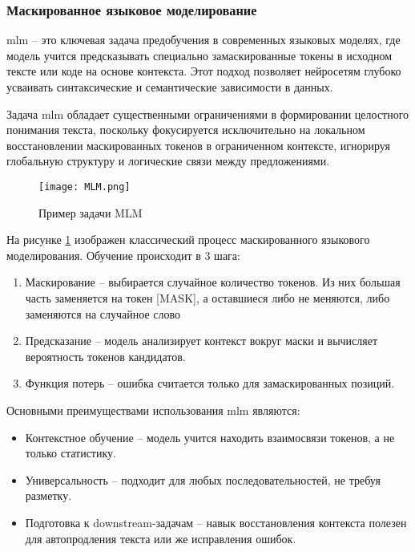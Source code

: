 \documentclass[../part_1.tex]{subfiles}
\begin{document}
\subsubsection{Маскированное языковое моделирование}
\par \acrfull{mlm} -- это ключевая задача предобучения в современных языковых моделях, где модель учится предсказывать специально замаскированные токены в исходном тексте или коде на основе контекста. Этот подход позволяет нейросетям глубоко усваивать синтаксические и семантические зависимости в данных.
\par Задача \acrshort{mlm} обладает существенными ограничениями в формировании целостного понимания текста, поскольку фокусируется исключительно на локальном восстановлении маскированных токенов в ограниченном контексте, игнорируя глобальную структуру и логические связи между предложениями.
\begin{figure}[h]
    \centering
    \texttt{[image: MLM.png]}
    \caption{Пример задачи MLM}
    \label{fig:mlm_bert}
\end{figure}
\par На рисунке \ref{fig:mlm_bert} изображен классический процесс маскированного языкового моделирования. Обучение происходит в 3 шага:
\begin{enumerate}
    \item Маскирование -- выбирается случайное количество токенов. Из них большая часть заменяется на токен [MASK], а оставшиеся либо не меняются, либо заменяются на случайное слово
    \item Предсказание -- модель анализирует контекст вокруг маски и вычисляет вероятность токенов кандидатов.
    \item Функция потерь -- ошибка считается только для замаскированных позиций.
\end{enumerate}
\par Основными преимуществами использования \acrshort{mlm} являются:
\begin{itemize}
    \item Контекстное обучение -- модель учится находить взаимосвязи токенов, а не только статистику.
    \item Универсальность -- подходит для любых последовательностей, не требуя разметку.
    \item Подготовка к downstream-задачам -- навык восстановления контекста полезен для автопродления текста или же исправления ошибок.
\end{itemize}
\end{document}
